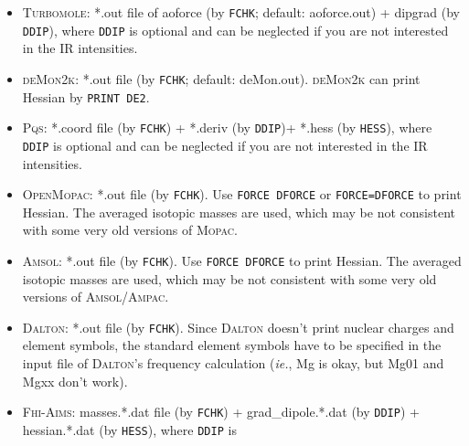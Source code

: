\documentclass[12pt,english]{extarticle}
\begin{document}
\begin{itemize}
\item \textsc{Turbomole}: *.out file of aoforce (by \verb|FCHK|; default: aoforce.out) +
dipgrad (by \verb|DDIP|), where
\verb|DDIP| is optional and can be neglected if you are not interested in
the IR intensities.
\item \textsc{deMon2k}: *.out file (by \verb|FCHK|; default: deMon.out). \textsc{deMon2k} can print Hessian
by \texttt{PRINT DE2}.
\item \textsc{Pqs}: *.coord file (by \verb|FCHK|) + *.deriv (by \verb|DDIP|)+ *.hess
(by \verb|HESS|), where \verb|DDIP| is optional and can be neglected if
you are not interested in the IR intensities.
\item \textsc{OpenMopac}: *.out file (by \verb|FCHK|). Use \texttt{FORCE DFORCE} or
\texttt{FORCE=DFORCE} to print Hessian. The averaged isotopic masses
are used, which may be not consistent with some very old versions of \textsc{Mopac}.
\item \textsc{Amsol}: *.out file (by \verb|FCHK|). Use \texttt{FORCE DFORCE} to print
Hessian. The averaged isotopic masses are used, which may be not
consistent with some very old versions of \textsc{Amsol/Ampac}.
\item \textsc{Dalton}: *.out file (by \verb|FCHK|). Since \textsc{Dalton} doesn't print nuclear
charges and element symbols, the standard element symbols have to be
specified in the input file of \textsc{Dalton}'s frequency calculation (\emph{ie.}, Mg is
okay, but Mg01 and Mgxx don't work).
\item \textsc{Fhi-Aims}: masses.*.dat file (by \verb|FCHK|) + grad{\_}dipole.*.dat (by
\verb|DDIP|) + hessian.*.dat (by \verb|HESS|), where \verb|DDIP| is

\end{itemize}
\end{document}
